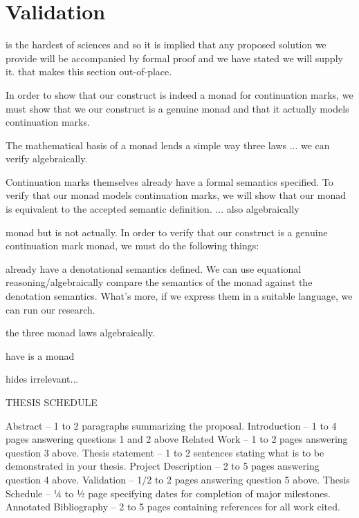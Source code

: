 \documentclass[ms]{byuprop} %
\begin{document}
\section{Validation}

is the hardest of sciences and so it is implied that any proposed solution we provide will
be accompanied by formal proof and we have stated we will supply it. that makes this
section out-of-place.

In order to show that our construct is indeed a monad for continuation marks, we must show
that we our construct is a genuine monad and that it actually models continuation marks.

The mathematical basis of a monad lends a simple way three laws ... we can verify
algebraically.

Continuation marks themselves already have a formal semantics specified. To verify that
our monad models continuation marks, we will show that our monad is equivalent to the
accepted semantic definition. ... also algebraically


monad but is not actually. In order to verify that our construct is a genuine continuation
mark monad, we must do the following things:

already have a denotational semantics defined. We can use equational
reasoning/algebraically compare the semantics of the monad against the denotation
semantics. What's more, if we express them in a suitable language, we can run our
research.

the three monad laws algebraically.

have is a monad

hides irrelevant...







THESIS SCHEDULE

Abstract – 1 to 2 paragraphs summarizing the proposal. Introduction – 1 to 4 pages
answering questions 1 and 2 above Related Work – 1 to 2 pages answering question 3 above.
Thesis statement – 1 to 2 sentences stating what is to be demonstrated in your thesis.
Project Description – 2 to 5 pages answering question 4 above. Validation – 1/2 to 2 pages
answering question 5 above. Thesis Schedule – ¼ to ½ page specifying dates for completion
of major milestones. Annotated Bibliography – 2 to 5 pages containing references for all
work cited.


 
\end{document}
